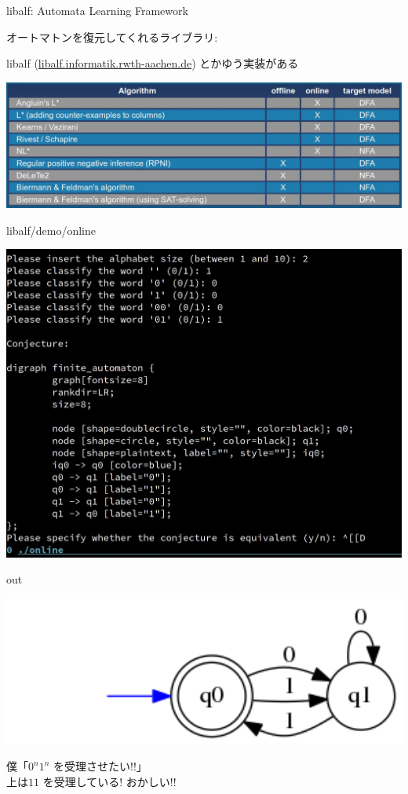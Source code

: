 \documentclass[professionalfont, 12pt, dvipdfmx, default, cjk]{beamer}
\begin{document}
\begin{frame}{libalf: Automata Learning Framework}

オートマトンを復元してくれるライブラリ:

libalf
(\href{http://libalf.informatik.rwth-aachen.de/index.php?page=about}{libalf.informatik.rwth-aachen.de})
とかゆう実装がある

\vspace*{3mm}

\centering
\includegraphics[width=1.00\textwidth,bb=0 0 1294 412]{img/libalf.jpg}

\end{frame}

\begin{frame}{libalf/demo/online}

\includegraphics[width=1.0\textwidth,bb=0 0 1667 1297]{img/online1.jpg}

\end{frame}

\begin{frame}{out}

\includegraphics[width=1.0\textwidth,bb=0 0 304 112]{img/1.png}

\vfill
\pause
僕「\(0^n1^n\) を受理させたい!!」\\上は\(11\) を受理している! おかしい!!

\end{frame}
\end{document}
